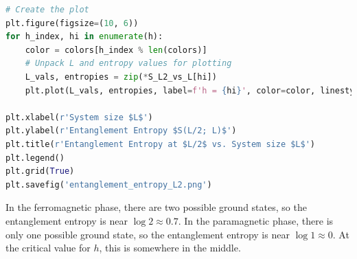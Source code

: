 \documentclass[12pt]{article}
\begin{document}
\begin{lstlisting}[language=Python]
# Create the plot
plt.figure(figsize=(10, 6))
for h_index, hi in enumerate(h):
    color = colors[h_index % len(colors)]
    # Unpack L and entropy values for plotting
    L_vals, entropies = zip(*S_L2_vs_L[hi])
    plt.plot(L_vals, entropies, label=f'h = {hi}', color=color, linestyle='-')

plt.xlabel(r'System size $L$')
plt.ylabel(r'Entanglement Entropy $S(L/2; L)$')
plt.title(r'Entanglement Entropy at $L/2$ vs. System size $L$')
plt.legend()
plt.grid(True)
plt.savefig('entanglement_entropy_L2.png')
\end{lstlisting}
In the ferromagnetic phase, there are two possible ground states, so the entanglement entropy is near $\log 2 \approx 0.7$. In the paramagnetic phase, there is only one possible ground state, so the entanglement entropy is near $\log 1 \approx 0$. At the critical value for $h$, this is somewhere in the middle.
\newpage
\end{document}
